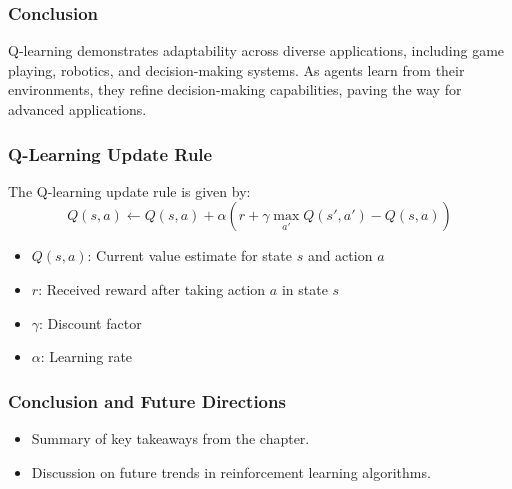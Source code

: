 \documentclass{beamer}
\begin{document}
\begin{frame}[fragile]
    \frametitle{Conclusion}
    Q-learning demonstrates adaptability across diverse applications, including game playing, robotics, and decision-making systems. As agents learn from their environments, they refine decision-making capabilities, paving the way for advanced applications.
\end{frame}

\begin{frame}[fragile]
    \frametitle{Q-Learning Update Rule}
    The Q-learning update rule is given by:
    \begin{equation}
    Q(s, a) \leftarrow Q(s, a) + \alpha \left( r + \gamma \max_{a'} Q(s', a') - Q(s, a) \right)
    \end{equation}
    \begin{itemize}
        \item $Q(s, a)$: Current value estimate for state $s$ and action $a$
        \item $r$: Received reward after taking action $a$ in state $s$
        \item $\gamma$: Discount factor
        \item $\alpha$: Learning rate
    \end{itemize}
\end{frame}

\begin{frame}[fragile]
    \frametitle{Conclusion and Future Directions}
    \begin{itemize}
        \item Summary of key takeaways from the chapter.
        \item Discussion on future trends in reinforcement learning algorithms.
    \end{itemize}
\end{frame}
\end{document}
